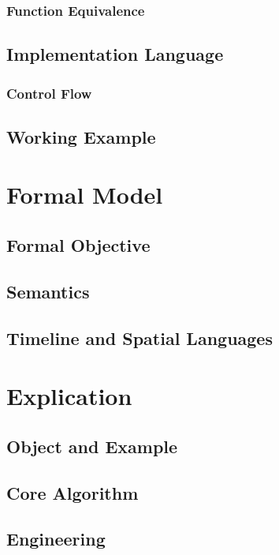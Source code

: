 \subsubsection{Function Equivalence}

\subsection{Implementation Language}

\subsubsection{Control Flow}

\subsection{Working Example}

\section{Formal Model}

\subsection{Formal Objective}

\subsection{Semantics}

\subsection{Timeline and Spatial Languages}

\section{Explication}

\subsection{Object and Example}

\subsection{Core Algorithm}

\subsection{Engineering}

